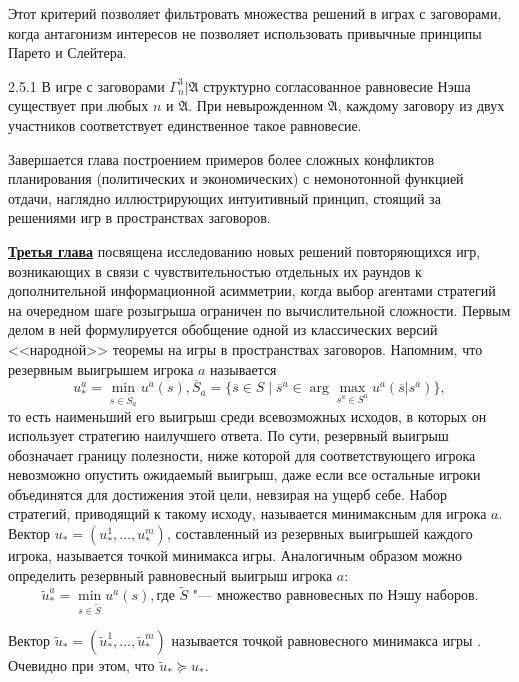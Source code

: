 Этот критерий позволяет фильтровать множества решений в играх с заговорами, когда антагонизм интересов не позволяет использовать привычные принципы Парето и Слейтера.

\begin{theorem}{2.5.1}
	В игре с заговорами $\Gamma^3_n | \mathfrak{A}$ структурно согласованное равновесие Нэша существует при любых $n$ и $\mathfrak{A}$. При невырожденном $\mathfrak{A}$, каждому заговору из двух участников соответствует единственное 	такое равновесие.
\end{theorem}

Завершается глава построением примеров более сложных конфликтов планирования (политических и экономических) с немонотонной функцией отдачи, наглядно иллюстрирующих интуитивный принцип, стоящий за решениями игр в пространствах заговоров.

\underline{\textbf{Третья глава}} посвящена исследованию новых решений повторяющихся игр, возникающих в связи с чувствительностью отдельных их раундов к дополнительной информационной асимметрии, когда выбор агентами стратегий на очередном шаге розыгрыша ограничен по вычислительной сложности. Первым делом в ней формулируется обобщение одной из классических версий <<народной>> теоремы на игры в пространствах заговоров. Напомним, что резервным выигрышем игрока $a$ называется
\begin{equation*}
	u^a_* = \min_{s \in \overline{S}_a} u^a(s), \overline{S}_a = \{\overline{s} \in S \mid \overline{s}^a \in \arg\max_{s^a \in S^a} u^a(\overline{s} | s^a)\},
\end{equation*}
то есть наименьший его выигрыш среди всевозможных исходов, в которых он использует стратегию наилучшего ответа. По сути, резервный выигрыш обозначает границу полезности, ниже которой для соответствующего игрока невозможно опустить ожидаемый выигрыш, даже если все остальные игроки объединятся для достижения этой цели, невзирая на ущерб себе. Набор стратегий, приводящий к такому исходу, называется минимаксным для игрока $a$. Вектор $u_* = (u^1_*, \ldots, u^m_*)$, составленный из резервных выигрышей каждого игрока, называется точкой минимакса игры. Аналогичным образом можно определить резервный равновесный выигрыш игрока $a$:
\begin{equation*}
	\tilde{u}^a_* = \min_{s \in \tilde{S}} u^a(s), \text{где $\tilde{S}$ "--- множество равновесных по Нэшу наборов}.
\end{equation*}

Вектор $\tilde{u}_* = (\tilde{u}^1_*, \ldots, \tilde{u}^m_*)$ называется точкой равновесного минимакса игры \smartcite{Fudenberg}. Очевидно при этом, что $\tilde{u}_* \succeq u_*$.

